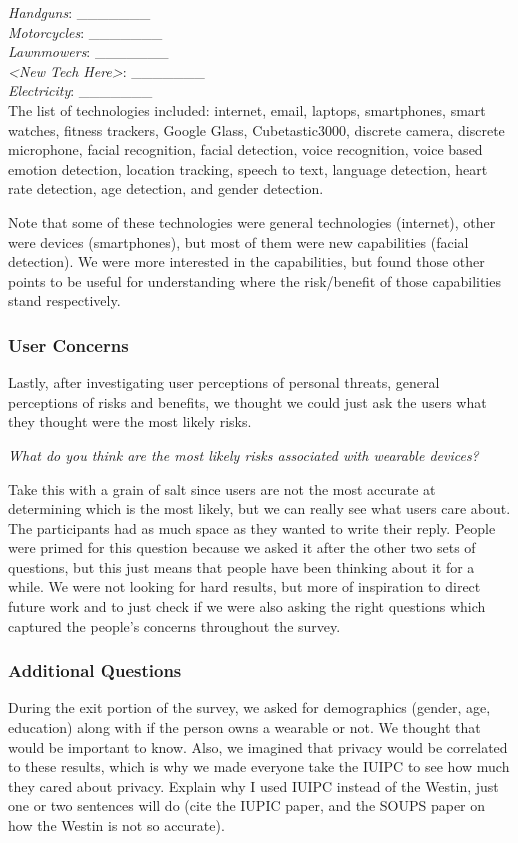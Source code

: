 \documentclass{acm_proc_article-sp}
\begin{document}
\textit{Handguns}: \_\_\_\_\_\_\_ \\
\textit{Motorcycles}: \_\_\_\_\_\_\_\\
\textit{Lawnmowers}: \_\_\_\_\_\_\_\\
\textit{<New Tech Here>}: \_\_\_\_\_\_\_\\
\textit{Electricity}: \_\_\_\_\_\_\_\\

The list of technologies included: internet, email, laptops, smartphones, smart watches, fitness trackers, Google Glass, Cubetastic3000, discrete camera, discrete microphone, facial recognition, facial detection, voice recognition, voice based emotion detection, location tracking, speech to text, language detection, heart rate detection, age detection, and gender detection. 

Note that some of these technologies were general technologies (internet), other were devices (smartphones), but most of them were new capabilities (facial detection). We were more interested in the capabilities, but found those other points to be useful for understanding where the risk/benefit of those capabilities stand respectively. 

\subsubsection{User Concerns}
Lastly, after investigating user perceptions of personal threats, general perceptions of risks and benefits, we thought we could just ask the users what they thought were the most likely risks. 

\textit{What do you think are the most likely risks associated with wearable devices?}

Take this with a grain of salt since users are not the most accurate at determining which is the most likely, but we can really see what users care about. The participants had as much space as they wanted to write their reply. People were primed for this question because we asked it after the other two sets of questions, but this just means that people have been thinking about it for a while. We were not looking for hard results, but more of inspiration to direct future work and to just check if we were also asking the right questions which captured the people's concerns throughout the survey. 

\subsubsection{Additional Questions}
During the exit portion of the survey, we asked for demographics (gender, age, education) along with if the person owns a wearable or not. We thought that would be important to know. Also, we imagined that privacy would be correlated to these results, which is why we made everyone take the IUIPC to see how much they cared about privacy. Explain why I used IUIPC instead of the Westin, just one or two sentences will do (cite the IUPIC paper, and the SOUPS paper on how the Westin is not so accurate). 
\end{document}
